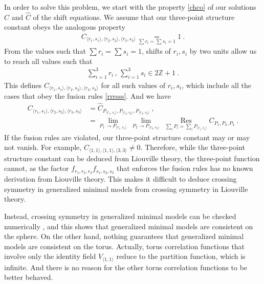 \documentclass[12pt, a4paper, notitlepage, twoside]{report}
\numberwithin{equation}{section}
\theoremstyle{break}
\begin{document}
In order to solve this problem, we start with the property \eqref{chco} of our solutions $C$ and $\hat C$ of the shift equations. We assume that our three-point structure constant obeys the analogous property
\begin{align}
 C_{\langle r_1,s_1\rangle ,\langle r_2,s_2\rangle ,\langle r_3,s_3 \rangle} \underset{\sum r_i =\sum s_i = 1}{=} 1\ .
\end{align}
From the values such that $\sum r_i=\sum s_i=1$, shifts of $r_i,s_i$ by two units allow us to reach all values such that 
\begin{align}
 \textstyle{\sum}_{i=1}^3 r_i\, , \, \textstyle{\sum}_{i=1}^3 s_i \in 2\mathbb{Z}+1\ .
 \label{srss}
\end{align}
This defines $C_{\langle r_1,s_1\rangle ,\langle r_2,s_2\rangle ,\langle r_3,s_3 \rangle}$ for all such values of $r_i,s_i$, which include all the cases that obey the fusion rules \eqref{rrrsss}. And we have 
\begin{align}
 C_{\langle r_1,s_1\rangle ,\langle r_2,s_2\rangle ,\langle r_3,s_3 \rangle} 
 &= \hat{C}_{P_{\langle r_1,s_1 \rangle}, P_{\langle r_2,s_2 \rangle} ,P_{\langle r_3,s_3 \rangle} } \ ,
 \label{chc}
 \\
& = \underset{P_1\to P_{\langle r_1,s_1 \rangle}}{\lim}\ 
\underset{P_2\to P_{\langle r_2,s_2 \rangle}}{\lim}\ 
\underset{\sum_i P_i = \sum_i P_{\langle r_i,s_i \rangle} }{\operatorname{ Res}} C_{P_1,P_2,P_3}\ .
\label{clc}
\end{align}
If the fusion rules are violated, our three-point structure constant may or may not vanish. For example, $C_{\langle 1,1\rangle , \langle 1,1 \rangle,\langle 3,3 \rangle} \neq 0$.
Therefore, while the three-point structure constant can be deduced from Liouville theory, the three-point function cannot, as the factor 
$f_{r_1,r_2,r_3} f_{s_1,s_2,s_3}$ that enforces the fusion rules has no known derivation from Liouville theory. 
This makes it difficult to deduce crossing symmetry in generalized minimal models from crossing symmetry in Liouville theory. 

Instead, crossing symmetry in generalized minimal models can be checked numerically \cite{rs15}, and this shows that generalized minimal models are consistent on the sphere. 
On the other hand, nothing guarantees that generalized minimal models are consistent on the torus. Actually, torus correlation functions that involve only the identity field $V_{\langle 1,1\rangle}$ reduce to the partition function, which is infinite. And there is no reason for the other torus correlation functions to be better behaved.  
\end{document}
